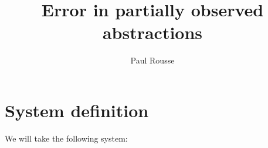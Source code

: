 \documentclass{article}
\newcommand{\vect}[1]{\ensuremath{ \mathbf{#1}}}
\theoremstyle{named}
\begin{document}
\title{Error in partially observed abstractions}
\author{Paul Rousse}
\maketitle



\newcommand{\mle}{\prec}
\newcommand{\mleq}{\preceq}
\newcommand{\minf}[1]{\underline{#1}}
\newcommand{\msup}[1]{\overline{#1}}



\newcommand{\x}{\vect{x}}%
\renewcommand{\u}{\vect{u}}%
\newcommand{\w}{\vect{w}}%

\newcommand{\y}{\vect{y}}%
\newcommand{\yk}{\vect{y}_k}%
\newcommand{\ykn}{\vect{y}_{k+1}}%

\newcommand{\xk}{\vect{x}_k}%
\newcommand{\xkn}{\vect{x}_{k+1}}%

\newcommand{\uk}{\vect{u}_k}%
\newcommand{\wk}{\vect{w}_k}%

\newcommand{\xo}{\vect{x}^o}%
\newcommand{\xr}{\vect{x}^r}%

\newcommand{\Ao}{A_o}%
\newcommand{\Ar}{A_r}%
\newcommand{\Aro}{A_{ro}}%

\newcommand{\Bo}{B_o}%
\newcommand{\Br}{B_r}%

\newcommand{\Eo}{E_o}%
\newcommand{\Er}{E_r}%
\newcommand{\Ero}{E_{ro}}%

\newcommand{\Xr}{X_r}%

\newcommand{\Xrinv}{\mathcal{X}_r}%
\newcommand{\xrinf}{\minf{\x}_r}%
\newcommand{\xrsup}{\msup{\x}_r}%


\newcommand{\Wsup}{\msup{W}}
\newcommand{\Winf}{\minf{W}}
\newcommand{\Wk}{W_k}

\renewcommand{\wr}{\vect{w}^r}
\newcommand{\wrsup}{\msup{\vect{w}}^r}
\newcommand{\wrinf}{\minf{\vect{w}}^r}
\newcommand{\Wrsup}{\msup{W}^r}
\newcommand{\Wrinf}{\minf{W}^r}
\newcommand{\Wrk}{W^r_k}

\newcommand{\traj}{\varphi}

\newcommand{\z}{\vect{z}}%
\newcommand{\zk}{\z_k}%
\newcommand{\zkn}{\z_{k+1}}%

\newcommand{\Z}{\mathbf{z}}
\newcommand{\Zk}{\Z_k}
\newcommand{\Zkn}{\Z_{k+1}}
\newcommand{\hk}{\vect{h}_{k}}
\newcommand{\h}{\vect{h}}
\newcommand{\abs}[1]{\left|#1\right|}
\newcommand{\wnoise}{\msup{\sigma}}

\newcommand{\size}{N}
\newcommand{\norminf}[1]{\left\|#1\right\|_{\infty}}

\section{System definition}
We will take the following system:
\end{document}
